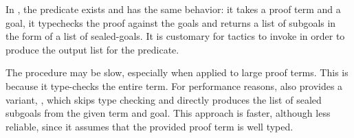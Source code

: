 In \elpi{}, the  predicate exists and has the same behavior: it takes
a proof term and a goal, it typechecks the proof against the goals and returns
a list of subgoals in the form of a list of sealed-goals. It is customary for
\elpi{} tactics to invoke  in order to produce the output list for the
 predicate.

The  procedure may be slow, especially when applied to large proof
terms. This is because it type-checks the entire term. For performance reasons,
\elpi also provides a variant, , which skips type checking
and directly produces the list of sealed subgoals from the given term and goal.
This approach is faster, although less reliable, since it assumes that the
provided proof term is well typed.


 
